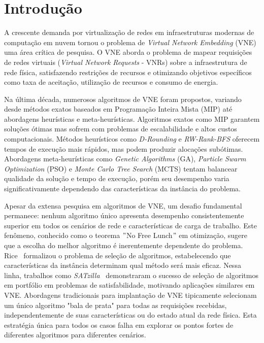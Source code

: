 \documentclass[conference]{IEEEtran}
\begin{document}
\section{Introdução}
\label{sec:Intro}

A crescente demanda por virtualização de redes em infraestruturas modernas de computação em nuvem tornou o problema de \textit{Virtual Network Embedding} (VNE) uma área crítica de pesquisa. O VNE aborda o problema de mapear requisições de redes virtuais (\textit{Virtual Network Requests} - VNRs) sobre a infraestrutura de rede física, satisfazendo restrições de recursos e otimizando objetivos específicos como taxa de aceitação, utilização de recursos e consumo de energia.

Na última década, numerosos algoritmos de VNE foram propostos, variando desde métodos exatos baseados em Programação Inteira Mista (MIP) até abordagens heurísticas e meta-heurísticas. Algoritmos exatos como MIP garantem soluções ótimas mas sofrem com problemas de escalabilidade e altos custos computacionais. Métodos heurísticos como \textit{D-Rounding} e \textit{RW-Rank-BFS} oferecem tempos de execução mais rápidos, mas podem produzir alocações subótimas. Abordagens meta-heurísticas como \textit{Genetic Algorithms} (GA), \textit{Particle Swarm Optimization} (PSO) e \textit{Monte Carlo Tree Search} (MCTS) tentam balancear qualidade da solução e tempo de execução, porém seu desempenho varia significativamente dependendo das características da instância do problema.

Apesar da extensa pesquisa em algoritmos de VNE, um desafio fundamental permanece: nenhum algoritmo único apresenta desempenho consistentemente superior em todos os cenários de rede e características de carga de trabalho.
Este fenômeno, conhecido como o teorema \("\)No Free Lunch\("\) em otimização, sugere que a escolha do melhor algoritmo é inerentemente dependente do problema.
Rice~\cite{rice1976algorithm} formalizou o problema de seleção de algoritmos, estabelecendo que características da instância determinam qual método será mais eficaz.
Nessa linha, trabalhos como \textit{SATzilla}~\cite{xu2012satzilla} demonstraram o sucesso de seleção de algoritmos em portfólio em problemas de satisfabilidade, motivando aplicações similares em VNE.
Abordagens tradicionais para implantação de VNE tipicamente selecionam um único algoritmo "bala de prata" para todas as requisições recebidas, independentemente de suas características ou do estado atual da rede física.
Esta estratégia única para todos os casos falha em explorar os pontos fortes de diferentes algoritmos para diferentes cenários.
\end{document}
